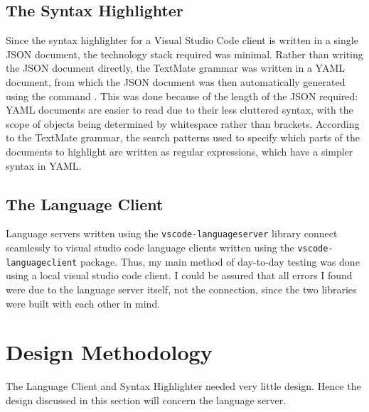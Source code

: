 \documentclass[../main.tex]{subfiles}
\begin{document}
\subsection{The Syntax Highlighter}
Since the syntax highlighter for a Visual Studio Code client is written in a single JSON document, the technology stack required was minimal. Rather than writing the JSON document directly, the TextMate grammar was written in a YAML document, from which the JSON document was then automatically generated using the command  \cite{yq_repo}. This was done because of the length of the JSON required: YAML documents are easier to read due to their less cluttered syntax, with the scope of objects being determined by whitespace rather than brackets. According to the TextMate grammar, the search patterns used to specify which parts of the documents to highlight are written as regular expressions, which have a simpler syntax in YAML. 

\subsection{The Language Client}
Language servers written using the \texttt{vscode-languageserver} library connect seamlessly to visual studio code language clients written using the \texttt{vscode-languageclient} package. Thus, my main method of day-to-day testing was done using a local visual studio code client. I could be assured that all errors I found were due to the language server itself, not the connection, since the two libraries were built with each other in mind. 
%
%
%
\section{Design Methodology}
The Language Client and Syntax Highlighter needed very little design. Hence the design discussed in this section will concern the language server.
\end{document}
